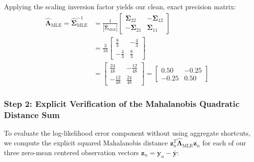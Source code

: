 \documentclass{article}
\begin{document}
Applying the scaling inversion factor yields our clean, exact precision matrix:
\begin{align*}
\hat{\boldsymbol{\Lambda}}_{\text{MLE}} = \hat{\boldsymbol{\Sigma}}_{\text{MLE}}^{-1} &= \frac{1}{|\hat{\boldsymbol{\Sigma}}_{\text{MLE}}|} \begin{bmatrix} \boldsymbol{\Sigma}_{22} & -\boldsymbol{\Sigma}_{12} \\ -\boldsymbol{\Sigma}_{21} & \boldsymbol{\Sigma}_{11} \end{bmatrix} \\
&= \frac{3}{16} \begin{bmatrix} \frac{8}{3} & -\frac{4}{3} \\ -\frac{4}{3} & \frac{8}{3} \end{bmatrix} \\
&= \begin{bmatrix} \frac{24}{48} & -\frac{12}{48} \\ -\frac{12}{48} & \frac{24}{48} \end{bmatrix} = \begin{bmatrix} \mathbf{0.50} & \mathbf{-0.25} \\ \mathbf{-0.25} & \mathbf{0.50} \end{bmatrix}
\end{align*}

\subsubsection{Step 2: Explicit Verification of the Mahalanobis Quadratic Distance Sum}

To evaluate the log-likelihood error component without using aggregate shortcuts, we compute the explicit squared Mahalanobis distance $\mathbf{z}_n^T \hat{\boldsymbol{\Lambda}}_{\text{MLE}} \mathbf{z}_n$ for each of our three zero-mean centered observation vectors $\mathbf{z}_n = \mathbf{y}_n - \bar{\mathbf{y}}$:
\end{document}
